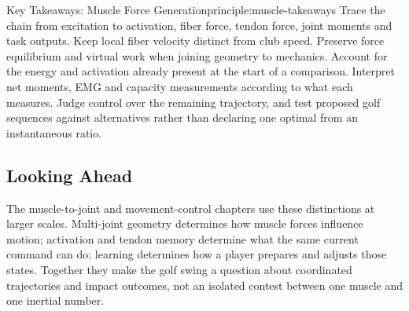 \begin{principle}{Key Takeaways: Muscle Force Generation}{principle:muscle-takeaways}
Trace the chain from excitation to activation, fiber force, tendon force, joint moments and task outputs. Keep local fiber velocity distinct from club speed. Preserve force equilibrium and virtual work when joining geometry to mechanics. Account for the energy and activation already present at the start of a comparison. Interpret net moments, EMG and capacity measurements according to what each measures. Judge control over the remaining trajectory, and test proposed golf sequences against alternatives rather than declaring one optimal from an instantaneous ratio.
\end{principle}

\subsection{Looking Ahead}
The muscle-to-joint and movement-control chapters use these distinctions at larger scales. Multi-joint geometry determines how muscle forces influence motion; activation and tendon memory determine what the same current command can do; learning determines how a player prepares and adjusts those states. Together they make the golf swing a question about coordinated trajectories and impact outcomes, not an isolated contest between one muscle and one inertial number.

